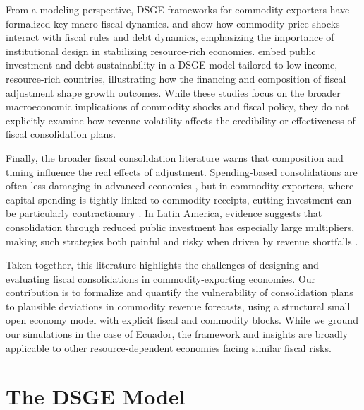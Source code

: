\documentclass[12pt]{article}
\begin{document}
From a modeling perspective, DSGE frameworks for commodity exporters have formalized key macro-fiscal dynamics. \citet{MedinaSoto2016} and \citet{MelinaYangZanna2016} show how commodity price shocks interact with fiscal rules and debt dynamics, emphasizing the importance of institutional design in stabilizing resource-rich economies. \citet{Buffie2012} embed public investment and debt sustainability in a DSGE model tailored to low-income, resource-rich countries, illustrating how the financing and composition of fiscal adjustment shape growth outcomes. While these studies focus on the broader macroeconomic implications of commodity shocks and fiscal policy, they do not explicitly examine how revenue volatility affects the credibility or effectiveness of fiscal consolidation plans.

Finally, the broader fiscal consolidation literature warns that composition and timing influence the real effects of adjustment. Spending-based consolidations are often less damaging in advanced economies \citep[see][]{AlesinaFaveroGiavazzi2015}, but in commodity exporters, where capital spending is tightly linked to commodity receipts, cutting investment can be particularly contractionary \citep[see][]{Guajardo2014}. In Latin America, evidence suggests that consolidation through reduced public investment has especially large multipliers, making such strategies both painful and risky when driven by revenue shortfalls \citep[see][]{CarriereSwallow2018}.

Taken together, this literature highlights the challenges of designing and evaluating fiscal consolidations in commodity-exporting economies. Our contribution is to formalize and quantify the vulnerability of consolidation plans to plausible deviations in commodity revenue forecasts, using a structural small open economy model with explicit fiscal and commodity blocks. While we ground our simulations in the case of Ecuador, the framework and insights are broadly applicable to other resource-dependent economies facing similar fiscal risks.


\section{The DSGE Model}

\end{document}
